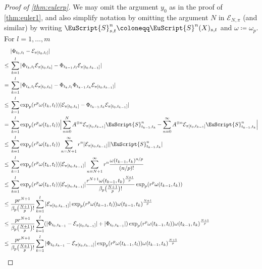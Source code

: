 \documentclass{article}
\def\Sig{\EuScript{S}}
\def\cE{\mathcal{E}}
\numberwithin{equation}{section}
\theoremstyle{definition}
\theoremstyle{remark}
\begin{document}
\begin{proof}[Proof of \autoref{thm:eulerp}]
We may omit the argument $y_0$ as in the proof of \autoref{thm:euler1}, and also simplify notation by omitting the argument $N$ in $\cE_{N,\pi}$ (and similar) by writing $\Sig^n_{s,t} \coloneqq \Sig^n(X)_{s,t}$ and $\omega \coloneqq \omega_p$. For $l = 1,\ldots,m$
\begin{align*}
&|\Phi_{t_0,t_l} - \mathcal E_{\pi[t_0,t_l]}| \\
\leq{} &\sum_{k = 1}^l |\Phi_{t_k, t_l}   \mathcal E_{\pi[t_0, t_k]} - \Phi_{t_{k-1}, t_l}   \mathcal E_{\pi[t_0,t_{k-1}]}| \\
={}&\sum_{k = 1}^l |\Phi_{t_k, t_l}   \mathcal E_{\pi[t_0, t_k]} - \Phi_{t_{k}, t_l}   \Phi_{t_{k-1}, t_k}   \mathcal E_{\pi[t_0,t_{k-1}]}| \\
\leq{}& \sum_{k = 1}^l \exp_p(r^p \omega(t_k,t_l)) |\mathcal E_{\pi[t_0, t_k]} - \Phi_{t_{k-1}, t_k}   \mathcal E_{\pi[t_0,t_{k-1}]}| \\
={}& \sum_{k = 1}^l \exp_p(r^p \omega(t_k,t_l)) \Big|\sum_{n = 0}^N A^{\otimes n} \mathcal E_{\pi[t_0,t_{k-1}]} \Sig^n_{t_{k-1},t_k} - \sum_{n = 0}^\infty A^{\otimes n} \mathcal E_{\pi[t_0,t_{k-1}]} \Sig^n_{t_{k-1},t_k} \Big| \\
\leq{}& \sum_{k = 1}^l \exp_p(r^p\omega(t_k,t_l)) \sum_{n = N+1}^\infty r^n|\mathcal E_{\pi[t_0, t_{k-1}]}||\Sig^n_{t_{k-1},t_k}| \\
\leq{}& \sum_{k = 1}^l \exp_p(r^p\omega(t_k,t_l)) |\mathcal E_{\pi[t_0, t_{k-1}]}| \sum_{n = N+1}^\infty r^n \frac{\omega(t_{k-1},t_k)^{n/p}}{(n/p)!} \\
\leq{}& \sum_{k = 1}^l \exp_p(r^p\omega(t_k,t_l)) |\mathcal E_{\pi[t_0, t_{k-1}]}| \frac{r^{N+1}\omega(t_{k - 1},t_k)^{\frac{N+1}{p}}}{\beta_p\big(\frac{N+1}{p}\big)!} \exp_p(r^p\omega(t_{k-1},t_k)) \\
\leq{}&\frac{p r^{N+1}}{\beta_p\big(\frac{N+1}{p}\big)!} \sum_{k = 1}^l |\mathcal E_{\pi[t_0, t_{k-1}]}| \exp_p(r^p \omega(t_{k-1},t_l)) \omega(t_{k-1},t_k)^{\frac{N+1}{p}} \\
\leq{}&\frac{p r^{N+1}}{\beta_p\big(\frac{N+1}{p}\big)!} \sum_{k = 1}^l (|\Phi_{t_0,t_{k-1}} - \mathcal E_{\pi[t_0,t_{k-1}]}| + |\Phi_{t_0,t_{k-1}}| ) \exp_p(r^p \omega(t_{k-1},t_l)) \omega(t_{k-1},t_k)^{\frac{N+1}{p}} \\
\leq{}&\frac{p r^{N+1}}{\beta_p\big(\frac{N+1}{p}\big)!} \sum_{k = 1}^l |\Phi_{t_0,t_{k-1}} - \mathcal E_{\pi[t_0,t_{k-1}]}| \exp_p(r^p \omega(t_{k-1},t_l)) \omega(t_{k-1},t_k)^{\frac{N+1}{p}} \\

\end{align*}
\end{proof}
\end{document}
